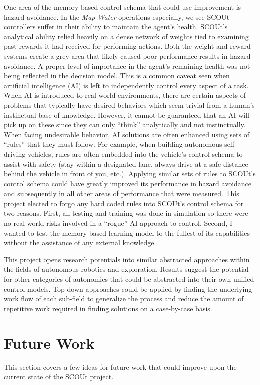 One area of the memory-based control schema that could use improvement is hazard avoidance.
In the \textit{Map Water} operations especially, we see SCOUt controllers suffer in their ability to maintain the agent's health.
SCOUt's analytical ability relied heavily on a dense network of weights tied to examining past rewards it had received for performing actions.
Both the weight and reward systems create a grey area that likely caused poor performance results in hazard avoidance.
A proper level of importance in the agent's remaining health was not being reflected in the decision model.
This is a common caveat seen when artificial intelligence (AI) is left to independently control every aspect of a task.
When AI is introduced to real-world environments, there are certain aspects of problems that typically have desired behaviors which seem trivial from a human's instinctual base of knowledge.
However, it cannot be guaranteed that an AI will pick up on these since they can only ``think'' analytically and not instinctually.
When facing undesirable behavior, AI solutions are often enhanced using sets of ``rules'' that they must follow.
For example, when building autonomous self-driving vehicles, rules are often embedded into the vehicle's control schema to assist with safety (stay within a designated lane, always drive at a safe distance behind the vehicle in front of you, etc.).
Applying similar sets of rules to SCOUt's control schema could have greatly improved its performance in hazard avoidance and subsequently in all other areas of performance that were measured.
This project elected to forgo any hard coded rules into SCOUt's control schema for two reasons.
First, all testing and training was done in simulation so there were no real-world risks involved in a ``rogue'' AI approach to control.
Second, I wanted to test the memory-based learning model to the fullest of its capabilities without the assistance of any external knowledge.

This project opens research potentials into similar abstracted approaches within the fields of autonomous robotics and exploration.
Results suggest the potential for other categories of autonomics that could be abstracted into their own unified control models.
Top-down approaches could be applied by finding the underlying work flow of each sub-field to generalize the process and reduce the amount of repetitive work required in finding solutions on a case-by-case basis.




\section{Future Work} \label{sec:future_work}
This section covers a few ideas for future work that could improve upon the current state of the SCOUt project.


